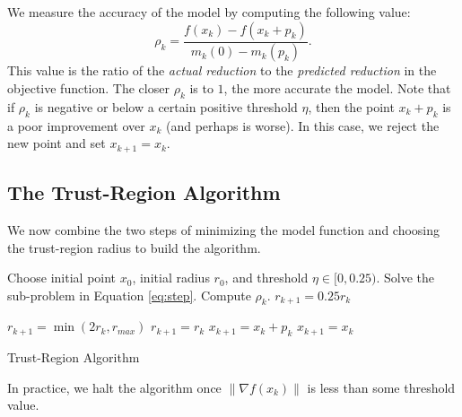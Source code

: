 We measure the accuracy of the model by computing the following value:
\[
\rho_k = \frac{f(x_k)-f(x_k+p_k)}{m_k(0) - m_k(p_k)}.
\]
This value is the ratio of the \emph{actual reduction} to the \emph{predicted reduction} in the objective function. The closer
$\rho_k$ is to $1$, the more accurate the model. 
Note that if $\rho_k$ is negative or below a certain positive threshold $\eta$, 
then the point $x_k+p_k$ is a poor improvement over $x_k$ (and perhaps is worse).
In this case, we reject the new point and set $x_{k+1} = x_k$.

\subsection*{The Trust-Region Algorithm}
We now combine the two steps of minimizing the model function and choosing the trust-region radius to build the algorithm.
\begin{algorithm}
\begin{algorithmic}[1]
    \State Choose initial point $x_0$, initial radius $r_0$, and threshold $\eta \in [0,0.25)$. 
        \State Solve the sub-problem in Equation \ref{eq:step}.
        \State Compute $\rho_k$.
            \State $r_{k+1} = 0.25r_k$

        \Else
                \State $r_{k+1} = \min(2r_k, r_{max})$
            \Else
                \State $r_{k+1} = r_k$
            \EndIf
        \EndIf
            \State $x_{k+1} = x_k + p_k$
        \Else
            \State $x_{k+1} = x_k$
        \EndIf
    \EndFor
\EndProcedure
\end{algorithmic}
\caption{Trust-Region Algorithm}
\label{alg:trustregion}
\end{algorithm}
In practice, we halt the algorithm once $\|\nabla f(x_k)\|$ is less than some threshold value.
